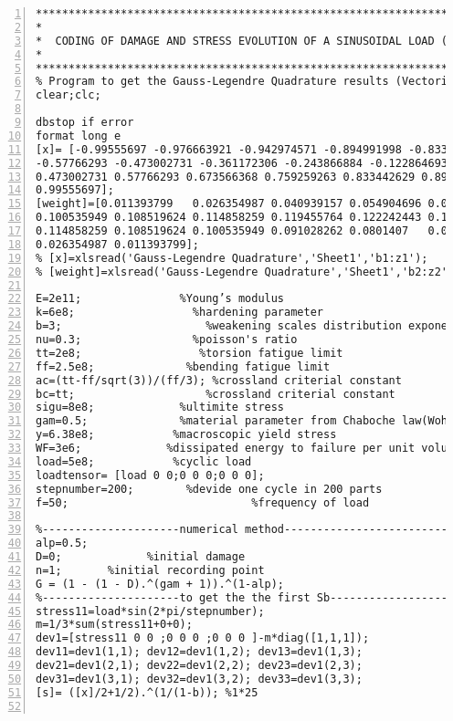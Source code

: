 \clearpage
\begin{lstlisting}[numbers=left, numberstyle=\tiny, keywordstyle=\color{blue!100}, commentstyle=\color{red!30!green!100!blue!100}, frame=shadowbox, rulesepcolor=\color{red!20!green!20!blue!20}]
***********************************************************************
*
*  CODING OF DAMAGE AND STRESS EVOLUTION OF A SINUSOIDAL LOAD (3 METHODS)
*               
***********************************************************************
% Program to get the Gauss-Legendre Quadrature results (Vectorized)
clear;clc;

dbstop if error
format long e
[x]= [-0.99555697 -0.976663921 -0.942974571 -0.894991998 -0.833442629 -0.759259263 -0.673566368...
-0.57766293 -0.473002731 -0.361172306 -0.243866884 -0.122864693 0 0.122864693 0.243866884 0.361172306...
0.473002731 0.57766293 0.673566368 0.759259263 0.833442629 0.894991998 0.942974571 0.976663921...
0.99555697];
[weight]=[0.011393799	0.026354987	0.040939157	0.054904696	0.068038334	0.0801407	0.091028262...
0.100535949	0.108519624	0.114858259	0.119455764	0.122242443	0.123176054	0.122242443	0.119455764...
0.114858259	0.108519624	0.100535949	0.091028262	0.0801407	0.068038334	0.054904696	0.040939157...
0.026354987	0.011393799];
% [x]=xlsread('Gauss-Legendre Quadrature','Sheet1','b1:z1');
% [weight]=xlsread('Gauss-Legendre Quadrature','Sheet1','b2:z2');

E=2e11;               %Young’s modulus
k=6e8;                  %hardening parameter
b=3;                      %weakening scales distribution exponent
nu=0.3;                 %poisson's ratio
tt=2e8;                  %torsion fatigue limit
ff=2.5e8;              %bending fatigue limit
ac=(tt-ff/sqrt(3))/(ff/3); %crossland criterial constant
bc=tt;                    %crossland criterial constant
sigu=8e8;             %ultimite stress
gam=0.5;              %material parameter from Chaboche law(Wohler curve exponent)
y=6.38e8;            %macroscopic yield stress
WF=3e6;             %dissipated energy to failure per unit volume
load=5e8;            %cyclic load
loadtensor= [load 0 0;0 0 0;0 0 0];
stepnumber=200;        %devide one cycle in 200 parts
f=50;                            %frequency of load

%---------------------numerical method-----------------------------
alp=0.5;
D=0;             %initial damage
n=1;       %initial recording point
G = (1 - (1 - D).^(gam + 1)).^(1-alp);
%---------------------to get the the first Sb-----------------------------
stress11=load*sin(2*pi/stepnumber);
m=1/3*sum(stress11+0+0);
dev1=[stress11 0 0 ;0 0 0 ;0 0 0 ]-m*diag([1,1,1]);
dev11=dev1(1,1); dev12=dev1(1,2); dev13=dev1(1,3);
dev21=dev1(2,1); dev22=dev1(2,2); dev23=dev1(2,3);
dev31=dev1(3,1); dev32=dev1(3,2); dev33=dev1(3,3);
[s]= ([x]/2+1/2).^(1/(1-b)); %1*25


\end{lstlisting}
